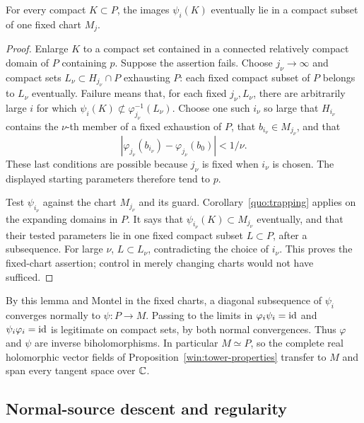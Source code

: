 \begin{lemma}\label{quo:inverse-tightness}
For every compact \(K\subset P\), the images \(\psi_i(K)\)
eventually lie in a compact subset of one fixed chart \(M_j\).
\end{lemma}
\begin{proof}
Enlarge \(K\) to a compact set contained in a connected relatively
compact domain of \(P\) containing \(p\). Suppose the assertion
fails. Choose \(j_\nu\to\infty\) and compact sets
\(L_\nu\subset H_{j_\nu}\cap P\) exhausting \(P\): each
fixed compact subset of \(P\) belongs to \(L_\nu\) eventually.
Failure means that, for each fixed \(j_\nu,L_\nu\), there are
arbitrarily large \(i\) for which
\(\psi_i(K)\not\subset\varphi_{j_\nu}^{-1}(L_\nu)\).
Choose one such \(i_\nu\) so large that \(H_{i_\nu}\) contains
the \(\nu\)-th member of a fixed exhaustion of \(P\), that
\(b_{i_\nu}\in M_{j_\nu}\), and that
\[
 |\varphi_{j_\nu}(b_{i_\nu})-
   \varphi_{j_\nu}(b_0)|<1/\nu.
\]
These last conditions are possible because \(j_\nu\) is fixed
when \(i_\nu\) is chosen. The displayed starting parameters
therefore tend to \(p\).

Test \(\psi_{i_\nu}\) against the chart \(M_{j_\nu}\) and its
guard. Corollary~\ref{quo:trapping} applies on the expanding
domains in \(P\). It says that \(\psi_{i_\nu}(K)\subset
M_{j_\nu}\) eventually, and that their tested parameters lie
in one fixed compact subset \(L\subset P\), after a subsequence.
For large \(\nu\), \(L\subset L_\nu\), contradicting the
choice of \(i_\nu\). This proves the fixed-chart assertion;
control in merely changing charts would not have sufficed.
\end{proof}

By this lemma and Montel in the fixed charts, a diagonal
subsequence of \(\psi_i\) converges normally to
\(\psi:P\to M\). Passing to the limits in
\(\varphi_i\psi_i=\operatorname{id}\) and \(\psi_i\varphi_i=\operatorname{id}\)
is legitimate on compact sets, by both normal convergences.
Thus \(\varphi\) and \(\psi\) are inverse biholomorphisms.
In particular \(M\simeq P\), so the complete real holomorphic
vector fields of Proposition~\ref{win:tower-properties} transfer
to \(M\) and span every tangent space over \(\mathbb C\).

\subsection{Normal-source descent and regularity}

